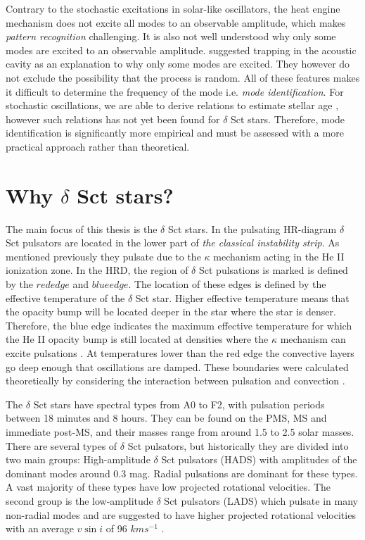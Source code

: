 Contrary to the stochastic excitations in solar-like oscillators, the heat engine mechanism does not excite all modes to an observable amplitude, which makes \textit{pattern recognition} challenging.  It is also not well understood why only some modes are excited to an observable amplitude. \citet{dziembowski1990} suggested trapping in the acoustic cavity as an explanation to why only some modes are excited.  They however do not exclude the possibility that the process is random. All of these features makes it difficult to determine the frequency of the mode i.e. \textit{mode identification}. For stochastic oscillations, we are able to derive relations to estimate stellar age \citep{kjeldsen2011amplitudes}, however such relations has not yet been found for $\delta $ Sct stars. Therefore, mode identification is significantly more empirical and must be assessed with a  more practical approach rather than theoretical.  


\section{Why $\delta$ Sct stars?}
\label{sec:why}

The main focus of this thesis is the $\delta$ Sct stars. In the pulsating HR-diagram $\delta$ Sct pulsators are located in the lower part of \textit{the classical instability strip}. As mentioned previously they pulsate due to the $\kappa$ mechanism acting in the He II ionization zone. In the HRD, the region of $\delta$  Sct  pulsations is marked is defined by the $red edge$ and $blue edge$. The location of these edges is defined by the effective temperature of the $\delta$ Sct star. Higher effective temperature means that the opacity bump will be located deeper in the star where the star is denser. Therefore, the blue edge indicates the maximum effective temperature for which the He II opacity bump is still located at densities where the $\kappa$ mechanism can excite pulsations \citep{pamyatnykh2000}. At temperatures lower than the red edge the convective layers go deep enough that oscillations are damped. These boundaries were calculated theoretically by considering the interaction between pulsation and convection \citep{grigahcene2005convection, dupret2004theoretical}.  

The $\delta$ Sct stars have spectral types from A0 to F2, with pulsation periods between 18 minutes and 8 hours. They can be found on the PMS, MS and immediate post-MS, and their masses range from around 1.5 to 2.5 solar masses. There are several types of $\delta$ Sct pulsators, but historically they are divided into two main groups: High-amplitude $\delta$ Sct pulsators (HADS) with amplitudes of the dominant modes around 0.3 mag. Radial pulsations are dominant for these types. A vast majority of these types have low projected rotational velocities. The second group is the low-amplitude $\delta$ Sct pulsators (LADS) which pulsate in many non-radial modes and are suggested to have higher projected rotational velocities with an average $v\sin i$ of 96 $km s^{-1}$ \citep{solano1997spectroscopic}.

